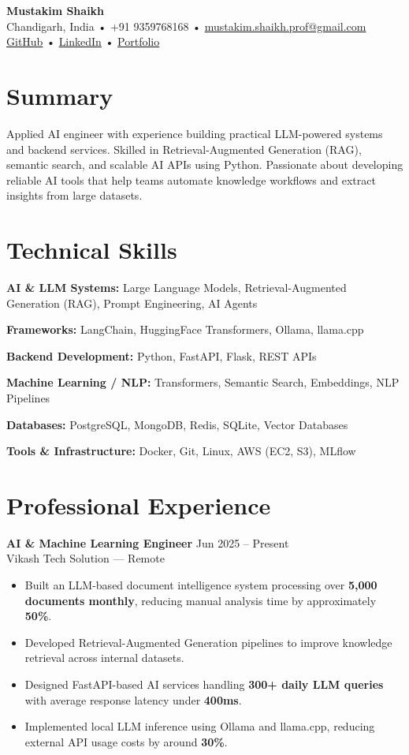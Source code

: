 \documentclass[10pt,a4paper]{article}
\begin{document}
\begin{center}
{\LARGE \textbf{Mustakim Shaikh}}\\
Chandigarh, India • +91 9359768168 • \href{mailto:mustakim.shaikh.prof@gmail.com}{mustakim.shaikh.prof@gmail.com}\\
\href{https://github.com/MustakimShaikh01}{GitHub} •
\href{https://linkedin.com/in/mustakim-sh}{LinkedIn} •
\href{https://mustakim-portfolio-jet.vercel.app}{Portfolio}
\end{center}

\section*{Summary}

Applied AI engineer with experience building practical LLM-powered systems and backend services. Skilled in Retrieval-Augmented Generation (RAG), semantic search, and scalable AI APIs using Python. Passionate about developing reliable AI tools that help teams automate knowledge workflows and extract insights from large datasets.

\section*{Technical Skills}

\textbf{AI \& LLM Systems:} Large Language Models, Retrieval-Augmented Generation (RAG), Prompt Engineering, AI Agents

\textbf{Frameworks:} LangChain, HuggingFace Transformers, Ollama, llama.cpp

\textbf{Backend Development:} Python, FastAPI, Flask, REST APIs

\textbf{Machine Learning / NLP:} Transformers, Semantic Search, Embeddings, NLP Pipelines

\textbf{Databases:} PostgreSQL, MongoDB, Redis, SQLite, Vector Databases

\textbf{Tools \& Infrastructure:} Docker, Git, Linux, AWS (EC2, S3), MLflow

\section*{Professional Experience}

\textbf{AI \& Machine Learning Engineer} \hfill Jun 2025 – Present \\
Vikash Tech Solution — Remote

\begin{itemize}
\item Built an LLM-based document intelligence system processing over \textbf{5,000 documents monthly}, reducing manual analysis time by approximately \textbf{50\%}.
\item Developed Retrieval-Augmented Generation pipelines to improve knowledge retrieval across internal datasets.
\item Designed FastAPI-based AI services handling \textbf{300+ daily LLM queries} with average response latency under \textbf{400ms}.
\item Implemented local LLM inference using Ollama and llama.cpp, reducing external API usage costs by around \textbf{30\%}.
\end{itemize}
\end{document}
